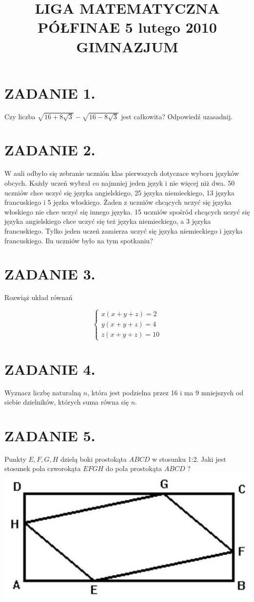 \documentclass[10pt]{article}
\title{LIGA MATEMATYCZNA \\
 PÓŁFINAE 5 lutego 2010 \\
 GIMNAZJUM }
\author{}
\date{}
\begin{document}
\maketitle
\section*{ZADANIE 1.}
Czy liczba \(\sqrt{16+8 \sqrt{3}}-\sqrt{16-8 \sqrt{3}}\) jest całkowita? Odpowiedź uzasadnij.

\section*{ZADANIE 2.}
W auli odbyło się zebranie ucznión klas pierwszych dotyczace wyboru języków obcych. Każdy uczeń wybrał co najmniej jeden język i nie więcej niż dwa. 50 uczniów chce uczyć się języka angielskiego, 25 języka niemieckiego, 13 języka francuskiego i 5 jęzka włoskiego. Żaden z uczniów chcących uczyć się języka włoskiego nie chce uczyć się innego języka. 15 uczniów spośród chcących uczyć się języka angielskiego chce uczyć się też języka niemieckiego, a 3 języka francuskiego. Tylko jeden uczeń zamierza uczyć się języka niemieckiego i języka francuskiego. Ilu uczniów było na tym spotkaniu?

\section*{ZADANIE 3.}
Rozwiąż układ równań

\[
\left\{\begin{array}{l}
x(x+y+z)=2 \\
y(x+y+z)=4 \\
z(x+y+z)=10
\end{array}\right.
\]

\section*{ZADANIE 4.}
Wyznacz liczbę naturalną \(n\), która jest podzielna przez 16 i ma 9 mniejszych od siebie dzielników, których suma równa się \(n\).

\section*{ZADANIE 5.}
Punkty \(E, F, G, H\) dzielą boki prostokąta \(A B C D\) w stosunku 1:2. Jaki jest stosunek pola czworokąta \(E F G H\) do pola prostokąta \(A B C D\) ?\\
\includegraphics[max width=\textwidth, center]{2024_11_21_b04ca9863e497de14b4bg-1}
\end{document}
